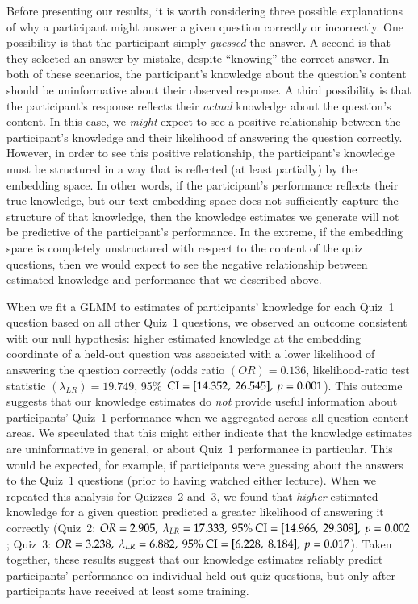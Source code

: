 \documentclass[10pt]{article}
\begin{document}
Before presenting our results, it is worth considering three possible
explanations of why a participant might answer a given question correctly or
incorrectly. One possibility is that the participant simply \textit{guessed}
the answer. A second is that they selected an answer by mistake, despite
``knowing'' the correct answer. In both of these scenarios, the participant's
knowledge about the question's content should be uninformative about their
observed response. A third possibility is that the participant's response
reflects their \textit{actual} knowledge about the question's content. In this
case, we \textit{might} expect to see a positive relationship between the
participant's knowledge and their likelihood of answering the question
correctly. However, in order to see this positive relationship, the
participant's knowledge must be structured in a way that is reflected (at least
partially) by the embedding space. In other words, if the participant's
performance reflects their true knowledge, but our text embedding space does
not sufficiently capture the structure of that knowledge, then the knowledge
estimates we generate will not be predictive of the participant's performance.
In the extreme, if the embedding space is completely unstructured with respect
to the content of the quiz questions, then we would expect to see the negative
relationship between estimated knowledge and performance that we described
above.

When we fit a GLMM to estimates of participants' knowledge for each Quiz~1
question based on all other Quiz~1 questions, we observed an outcome consistent
with our null hypothesis: higher estimated knowledge at the embedding
coordinate of a held-out question was associated with a lower likelihood of
answering the question correctly (odds ratio $(OR) = 0.136$, likelihood-ratio
test statistic $(\lambda_{LR}) = 19.749$, 95\%\ $\textnormal{CI} = [14.352,\
26.545],\ p = 0.001$). This outcome suggests that our knowledge estimates do
\textit{not} provide useful information about participants' Quiz~1 performance
when we aggregated across all question content areas. We speculated that this
might either indicate that the knowledge estimates are uninformative in
general, or about Quiz~1 performance in particular. This would be expected, for
example, if participants were guessing about the answers to the Quiz~1
questions (prior to having watched either lecture). When we repeated this
analysis for Quizzes~2 and~3, we found that \textit{higher} estimated knowledge
for a given question predicted a greater likelihood of answering it correctly
(Quiz~2: $OR = 2.905,\ \lambda_{LR} = 17.333,\ 95\%\ \textnormal{CI} =
[14.966,\ 29.309],\ p = 0.002$; Quiz~3: $OR = 3.238,\ \lambda_{LR} = 6.882,\
95\%\ \textnormal{CI} = [6.228,\ 8.184],\ p = 0.017$). Taken together, these
results suggest that our knowledge estimates reliably predict participants'
performance on individual held-out quiz questions, but only after participants
have received at least some training.
\end{document}
